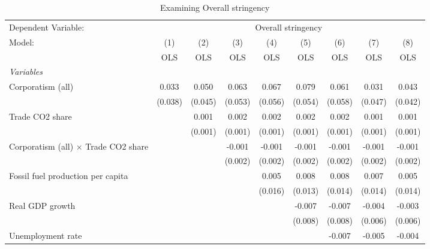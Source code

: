 
\begin{table}[htbp]
   \caption{Examining Overall stringency}
   \centering
   \begin{tabular}{lcccccccc}
      \toprule
      Dependent Variable: & \multicolumn{8}{c}{Overall stringency}\\
      Model:                                      & (1)     & (2)     & (3)     & (4)     & (5)     & (6)     & (7)     & (8)\\  
                                                  &  OLS    & OLS     & OLS     & OLS     & OLS     & OLS     & OLS     & OLS\\  
      \midrule
      \emph{Variables}\\
      Corporatism (all)                           & 0.033   & 0.050   & 0.063   & 0.067   & 0.079   & 0.061   & 0.031   & 0.043\\   
                                                  & (0.038) & (0.045) & (0.053) & (0.056) & (0.054) & (0.058) & (0.047) & (0.042)\\   
      Trade CO2 share                             &         & 0.001   & 0.002   & 0.002   & 0.002   & 0.002   & 0.001   & 0.001\\   
                                                  &         & (0.001) & (0.001) & (0.001) & (0.001) & (0.001) & (0.001) & (0.001)\\   
      Corporatism (all) $\times$ Trade CO2 share  &         &         & -0.001  & -0.001  & -0.001  & -0.001  & -0.001  & -0.001\\   
                                                  &         &         & (0.002) & (0.002) & (0.002) & (0.002) & (0.002) & (0.002)\\   
      Fossil fuel production per capita           &         &         &         & 0.005   & 0.008   & 0.008   & 0.007   & 0.005\\   
                                                  &         &         &         & (0.016) & (0.013) & (0.014) & (0.014) & (0.014)\\   
      Real GDP growth                             &         &         &         &         & -0.007  & -0.007  & -0.004  & -0.003\\   
                                                  &         &         &         &         & (0.008) & (0.008) & (0.006) & (0.006)\\   
      Unemployment rate                           &         &         &         &         &         & -0.007  & -0.005  & -0.004\\   

\end{tabular}
\end{table}
